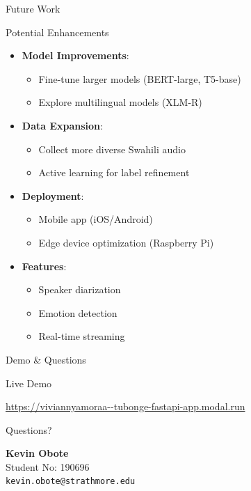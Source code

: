 \documentclass[aspectratio=169,10pt]{beamer}
\begin{document}
\begin{frame}{Future Work}
\begin{block}{Potential Enhancements}
\begin{itemize}
    \item \textbf{Model Improvements}:
    \begin{itemize}
        \item Fine-tune larger models (BERT-large, T5-base)
        \item Explore multilingual models (XLM-R)
    \end{itemize}
    \item \textbf{Data Expansion}:
    \begin{itemize}
        \item Collect more diverse Swahili audio
        \item Active learning for label refinement
    \end{itemize}
    \item \textbf{Deployment}:
    \begin{itemize}
        \item Mobile app (iOS/Android)
        \item Edge device optimization (Raspberry Pi)
    \end{itemize}
    \item \textbf{Features}:
    \begin{itemize}
        \item Speaker diarization
        \item Emotion detection
        \item Real-time streaming
    \end{itemize}
\end{itemize}
\end{block}
\end{frame}

\begin{frame}{Demo \& Questions}
\begin{center}
\Huge{Live Demo}

\vspace{1cm}

\Large{\url{https://viviannyamoraa--tubonge-fastapi-app.modal.run}}

\vspace{1cm}

\Huge{Questions?}

\vspace{0.5cm}

\normalsize
\textbf{Kevin Obote} \\
Student No: 190696 \\
\texttt{kevin.obote@strathmore.edu}
\end{center}
\end{frame}
\end{document}
